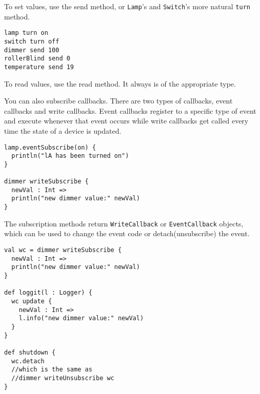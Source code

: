 To set values, use the send method, or \lstinline!Lamp!'s and \lstinline!Switch!'s more natural \lstinline!turn! method.

\begin{lstlisting}
lamp turn on
switch turn off
dimmer send 100
rollerBlind send 0
temperature send 19
\end{lstlisting}

To read values, use the read method. It always is of the appropriate type.

You can also subscribe callbacks. There are two types of callbacks, event callbacks and write callbacks. Event callbacks register to a specific type of event and execute whenever that event occurs while write callbacks get called every time the state of a device is updated.

\begin{lstlisting}
lamp.eventSubscribe(on) {
  println("lA has been turned on")
}

dimmer writeSubscribe {
  newVal : Int =>
  println("new dimmer value:" newVal)
}
\end{lstlisting}

The subscription methods return \lstinline!WriteCallback! or \lstinline!EventCallback! objects, which can be used to change the event code or detach(unsubscribe) the event.

\begin{lstlisting}
val wc = dimmer writeSubscribe {
  newVal : Int =>
  println("new dimmer value:" newVal)
}

def loggit(l : Logger) {
  wc update {
    newVal : Int =>
    l.info("new dimmer value:" newVal)
  }
}

def shutdown {
  wc.detach
  //which is the same as
  //dimmer writeUnsubscribe wc
}
\end{lstlisting}
